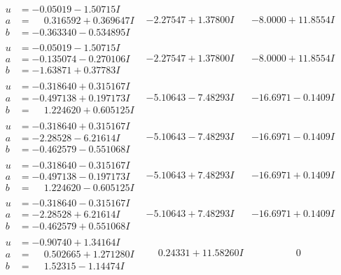 \documentclass[1p]{elsarticle_modified}
\theoremstyle{definition}
\begin{document}
$$\begin{array}{c|c|c}
\begin{aligned}
u &= -0.05019 - 1.50715 I \\
a &= \phantom{-}0.316592 + 0.369647 I \\
b &= -0.363340 - 0.534895 I\end{aligned}
 & -2.27547 + 1.37800 I & -8.0000 + 11.8554 I \\ \hline\begin{aligned}
u &= -0.05019 - 1.50715 I \\
a &= -0.135074 - 0.270106 I \\
b &= -1.63871 + 0.37783 I\end{aligned}
 & -2.27547 + 1.37800 I & -8.0000 + 11.8554 I \\ \hline\begin{aligned}
u &= -0.318640 + 0.315167 I \\
a &= -0.497138 + 0.197173 I \\
b &= \phantom{-}1.224620 + 0.605125 I\end{aligned}
 & -5.10643 - 7.48293 I & -16.6971 - 0.1409 I \\ \hline\begin{aligned}
u &= -0.318640 + 0.315167 I \\
a &= -2.28528 - 6.21614 I \\
b &= -0.462579 - 0.551068 I\end{aligned}
 & -5.10643 - 7.48293 I & -16.6971 - 0.1409 I \\ \hline\begin{aligned}
u &= -0.318640 - 0.315167 I \\
a &= -0.497138 - 0.197173 I \\
b &= \phantom{-}1.224620 - 0.605125 I\end{aligned}
 & -5.10643 + 7.48293 I & -16.6971 + 0.1409 I \\ \hline\begin{aligned}
u &= -0.318640 - 0.315167 I \\
a &= -2.28528 + 6.21614 I \\
b &= -0.462579 + 0.551068 I\end{aligned}
 & -5.10643 + 7.48293 I & -16.6971 + 0.1409 I \\ \hline\begin{aligned}
u &= -0.90740 + 1.34164 I \\
a &= \phantom{-}0.502665 + 1.271280 I \\
b &= \phantom{-}1.52315 - 1.14474 I\end{aligned}
 & \phantom{-}0.24331 + 11.58260 I & \phantom{-0.000000 } 0 \\ \hline\begin{aligned}

\end{aligned}
\end{array}$$
\end{document}
